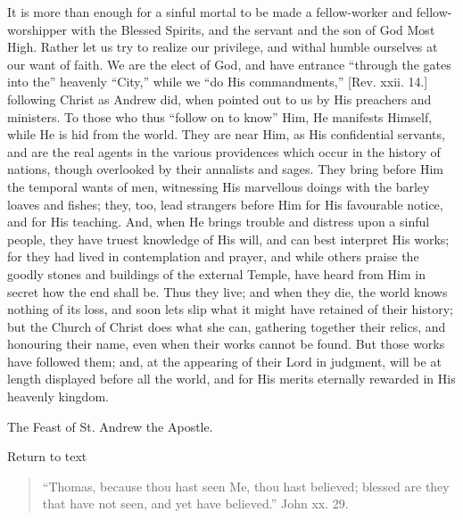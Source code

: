 It is more than enough for a sinful mortal to be made a
fellow-worker and fellow-worshipper with the Blessed Spirits, and the
servant and the son of God Most High. Rather let us try to realize our
privilege, and withal humble ourselves at our want of faith. We are
the elect of God, and have entrance ``through the gates into
the'' heavenly ``City,'' while we ``do His
commandments,'' [Rev. xxii. 14.] following Christ as Andrew did,
when pointed out to us by His preachers and ministers. To those who
thus ``follow on to know'' Him, He manifests Himself, while He
is hid from the world. They are near Him, as His confidential
servants, and are the real agents in the various providences which
occur in the history of nations, though overlooked by their annalists
and sages. They bring before Him the temporal wants of men, witnessing
His marvellous doings with the barley loaves and fishes; they, too,
lead strangers before Him for His favourable notice, and for His
teaching. And, when He brings trouble and distress upon a sinful
people, they have truest knowledge of His will, and can best interpret
His works; for they had lived in contemplation and prayer, and while
others praise the goodly stones and buildings of the external Temple,
have heard from Him in secret how the end shall be. Thus they live;
and when they die, the world knows nothing of its loss, and soon lets
slip what it might have retained of their history; but the Church of
Christ does what she can, gathering together their relics, and
honouring their name, even when their works cannot be found. But those
works have followed them; and, at the appearing of their Lord in
judgment, will be at length displayed before all the world, and for
His merits eternally rewarded in His heavenly kingdom.


The Feast of St. Andrew the Apostle.

Return to text


\begin{quote}

``Thomas, because thou hast seen Me, thou hast believed;
blessed are they that have not seen, and yet have believed.''
John xx. 29.

\end{quote}

